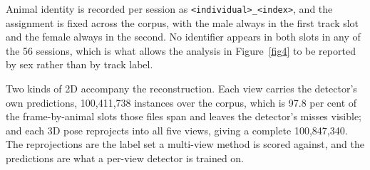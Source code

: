 Animal identity is recorded per session as \texttt{<individual>\_<index>}, and
the assignment is fixed across the corpus, with the male always in the first
track slot and the female always in the second. No identifier appears in both
slots in any of the 56 sessions, which is what allows the analysis in
Figure~\ref{fig4} to be reported by sex rather than by track label.

%
%
%
%
%

Two kinds of 2D accompany the reconstruction. Each view carries the detector's
own predictions, 100,411,738 instances over the corpus, which is 97.8 per cent
of the frame-by-animal slots those files span and leaves the detector's misses
visible; and each 3D pose reprojects into all five views, giving a complete
100,847,340. The reprojections are the label set a multi-view method is scored
against, and the predictions are what a per-view detector is trained on.


